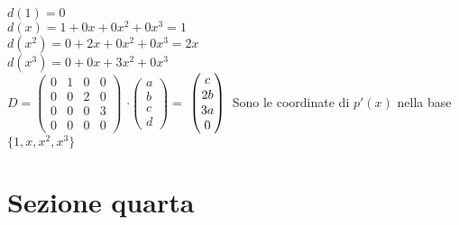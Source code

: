 \documentclass[12pt]{article}
\begin{document}
\noindent$d(1)=0$\\
$d(x)=1+0x+0x^2 + 0x^3 = 1$\\
$d(x^2)=0+2x+0x^2+0x^3= 2x$\\
$d(x^3) = 0+0x+3x^2+0x^3$\\
$D=
\begin{pmatrix}
    0 & 1 & 0 & 0\\
    0 & 0 & 2 & 0\\
    0 & 0 & 0 & 3\\
    0 & 0 & 0 & 0
\end{pmatrix}
$
$\cdot
\left(\begin{matrix}
    a\\
    b\\
    c\\
    d
\end{matrix}\right) = 
$
$
\left(\begin{matrix}
    c\\
    2b\\
    3a\\
    0
\end{matrix}\right)\\
$
Sono le coordinate di $p'(x)$ nella base $\{1,x,x^2,x^3\}$
\section{Sezione quarta}
\end{document}
